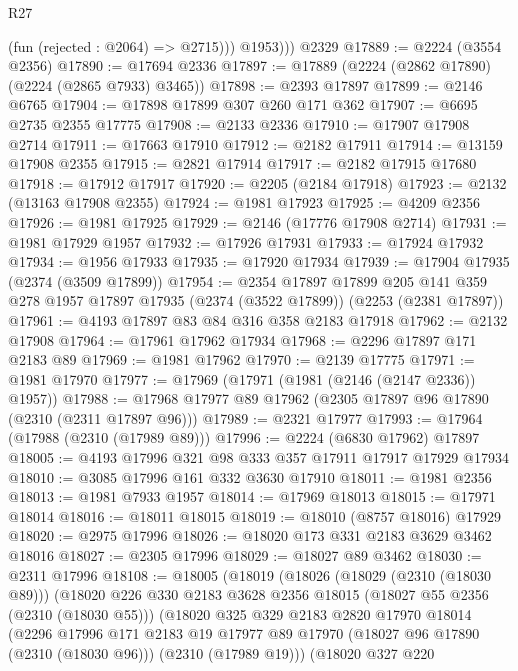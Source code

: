 \begin{lexlean}{R27}
\begin{coremodule}
            (fun (rejected : @2064) => @2715)))
          @1953)))
    @2329
@17889 := @2224 (@3554 @2356)
@17890 := @17694 @2336
@17897 := @17889 (@2224 (@2862 @17890) (@2224 (@2865 @7933) @3465))
@17898 := @2393 @17897
@17899 := @2146 @6765
@17904 := @17898 @17899 @307 @260 @171 @362
@17907 := @6695 @2735 @2355 @17775
@17908 := @2133 @2336
@17910 := @17907 @17908 @2714
@17911 := @17663 @17910
@17912 := @2182 @17911
@17914 := @13159 @17908 @2355
@17915 := @2821 @17914
@17917 := @2182 @17915 @17680
@17918 := @17912 @17917
@17920 := @2205 (@2184 @17918)
@17923 := @2132 (@13163 @17908 @2355)
@17924 := @1981 @17923
@17925 := @4209 @2356
@17926 := @1981 @17925
@17929 := @2146 (@17776 @17908 @2714)
@17931 := @1981 @17929 @1957
@17932 := @17926 @17931
@17933 := @17924 @17932
@17934 := @1956 @17933
@17935 := @17920 @17934
@17939 := @17904 @17935 (@2374 (@3509 @17899))
@17954 := @2354
    @17897
    @17899
    @205
    @141
    @359
    @278
    @1957
    @17897
    @17935
    (@2374 (@3522 @17899))
    (@2253 (@2381 @17897))
@17961 := @4193 @17897 @83 @84 @316 @358 @2183 @17918
@17962 := @2132 @17908
@17964 := @17961 @17962 @17934
@17968 := @2296 @17897 @171 @2183 @89
@17969 := @1981 @17962
@17970 := @2139 @17775
@17971 := @1981 @17970
@17977 := @17969 (@17971 (@1981 (@2146 (@2147 @2336)) @1957))
@17988 := @17968 @17977 @89 @17962 (@2305 @17897 @96 @17890 (@2310 (@2311 @17897 @96)))
@17989 := @2321 @17977
@17993 := @17964 (@17988 (@2310 (@17989 @89)))
@17996 := @2224 (@6830 @17962) @17897
@18005 := @4193 @17996 @321 @98 @333 @357 @17911 @17917 @17929 @17934
@18010 := @3085 @17996 @161 @332 @3630 @17910
@18011 := @1981 @2356
@18013 := @1981 @7933 @1957
@18014 := @17969 @18013
@18015 := @17971 @18014
@18016 := @18011 @18015
@18019 := @18010 (@8757 @18016) @17929
@18020 := @2975 @17996
@18026 := @18020 @173 @331 @2183 @3629 @3462 @18016
@18027 := @2305 @17996
@18029 := @18027 @89 @3462
@18030 := @2311 @17996
@18108 := @18005
    (@18019
      (@18026
        (@18029 (@2310 (@18030 @89)))
        (@18020
          @226
          @330
          @2183
          @3628
          @2356
          @18015
          (@18027 @55 @2356 (@2310 (@18030 @55)))
          (@18020
            @325
            @329
            @2183
            @2820
            @17970
            @18014
            (@2296
              @17996
              @171
              @2183
              @19
              @17977
              @89
              @17970
              (@18027 @96 @17890 (@2310 (@18030 @96)))
              (@2310 (@17989 @19)))
            (@18020
              @327
              @220

\end{coremodule}
\end{lexlean}
